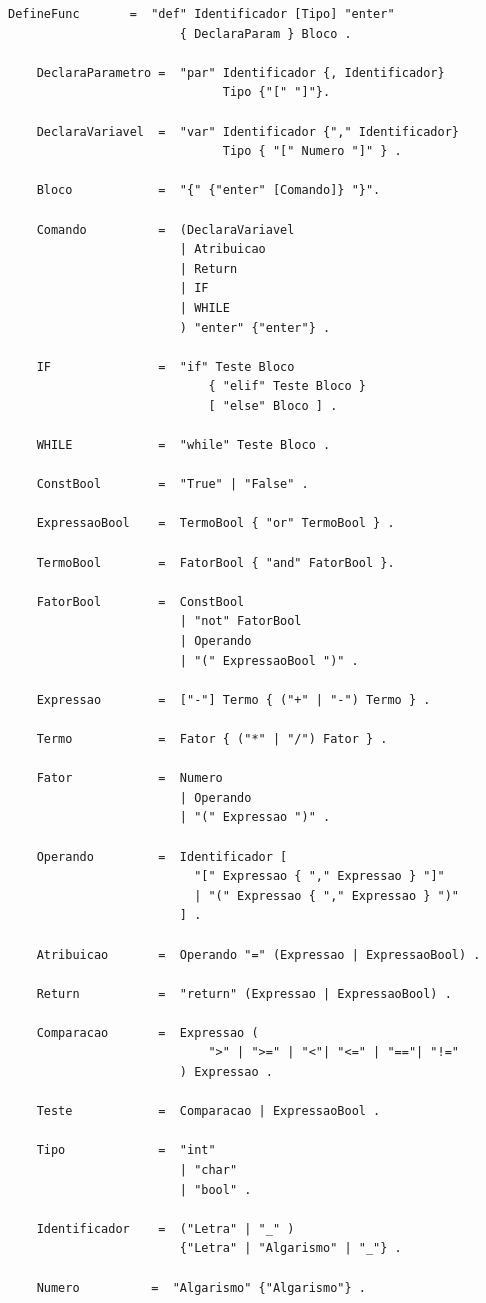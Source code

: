 \documentclass[a4paper,12pt]{report}
\begin{document}
    \begin{lstlisting}[numbers=none,frame=none]
    DefineFunc       =  "def" Identificador [Tipo] "enter"
                        { DeclaraParam } Bloco .

    DeclaraParametro =  "par" Identificador {, Identificador}
                              Tipo {"[" "]"}.

    DeclaraVariavel  =  "var" Identificador {"," Identificador}
                              Tipo { "[" Numero "]" } .

    Bloco            =  "{" {"enter" [Comando]} "}".

    Comando          =  (DeclaraVariavel
                        | Atribuicao
                        | Return
                        | IF
                        | WHILE
                        ) "enter" {"enter"} .

    IF               =  "if" Teste Bloco
                            { "elif" Teste Bloco }
                            [ "else" Bloco ] .

    WHILE            =  "while" Teste Bloco .

    ConstBool        =  "True" | "False" .

    ExpressaoBool    =  TermoBool { "or" TermoBool } .

    TermoBool        =  FatorBool { "and" FatorBool }.

    FatorBool        =  ConstBool
                        | "not" FatorBool
                        | Operando
                        | "(" ExpressaoBool ")" .

    Expressao        =  ["-"] Termo { ("+" | "-") Termo } .

    Termo            =  Fator { ("*" | "/") Fator } .

    Fator            =  Numero
                        | Operando
                        | "(" Expressao ")" .

    Operando         =  Identificador [
                          "[" Expressao { "," Expressao } "]"
                          | "(" Expressao { "," Expressao } ")"
                        ] .

    Atribuicao       =  Operando "=" (Expressao | ExpressaoBool) .

    Return           =  "return" (Expressao | ExpressaoBool) .

    Comparacao       =  Expressao (
                            ">" | ">=" | "<"| "<=" | "=="| "!="
                        ) Expressao .

    Teste            =  Comparacao | ExpressaoBool .

    Tipo             =  "int"
                        | "char"
                        | "bool" .

    Identificador    =  ("Letra" | "_" )
                        {"Letra" | "Algarismo" | "_"} .

    Numero          =  "Algarismo" {"Algarismo"} .
    \end{lstlisting}
\end{document}
